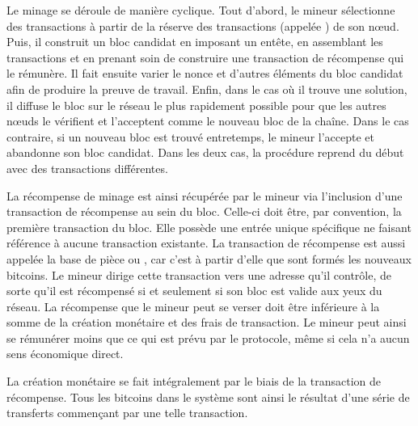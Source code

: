 
Le minage se déroule de manière cyclique. Tout d'abord, le mineur sélectionne des transactions à partir de la réserve des transactions (appelée ) de son nœud. Puis, il construit un bloc candidat en imposant un entête, en assemblant les transactions et en prenant soin de construire une transaction de récompense qui le rémunère. Il fait ensuite varier le nonce et d'autres éléments du bloc candidat afin de produire la preuve de travail. Enfin, dans le cas où il trouve une solution, il diffuse le bloc sur le réseau le plus rapidement possible pour que les autres nœuds le vérifient et l'acceptent comme le nouveau bloc de la chaîne. Dans le cas contraire, si un nouveau bloc est trouvé entretemps, le mineur l'accepte et abandonne son bloc candidat. Dans les deux cas, la procédure reprend du début avec des transactions différentes.

La récompense de minage est ainsi récupérée par le mineur via l'inclusion d'une transaction de récompense au sein du bloc. Celle-ci doit être, par convention, la première transaction du bloc. Elle possède une entrée unique spécifique ne faisant référence à aucune transaction existante. La transaction de récompense est aussi appelée la base de pièce ou , car c'est à partir d'elle que sont formés les nouveaux bitcoins. Le mineur dirige cette transaction vers une adresse qu'il contrôle, de sorte qu'il est récompensé si et seulement si son bloc est valide aux yeux du réseau. La récompense que le mineur peut se verser doit être inférieure à la somme de la création monétaire et des frais de transaction. Le mineur peut ainsi se rémunérer moins que ce qui est prévu par le protocole, même si cela n'a aucun sens économique direct.


La création monétaire se fait intégralement par le biais de la transaction de récompense. Tous les bitcoins dans le système sont ainsi le résultat d'une série de transferts commençant par une telle transaction.


